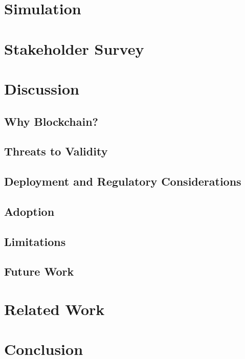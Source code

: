 \documentclass[conference]{IEEEtran}
\begin{document}
\section{Simulation}
\section{Stakeholder Survey}
\section{Discussion}
\subsection{Why Blockchain?}
\subsection{Threats to Validity}
\subsection{Deployment and Regulatory Considerations}
\subsection{Adoption}
\subsection{Limitations}
\subsection{Future Work}
\section{Related Work}
\section{Conclusion}
\end{document}
